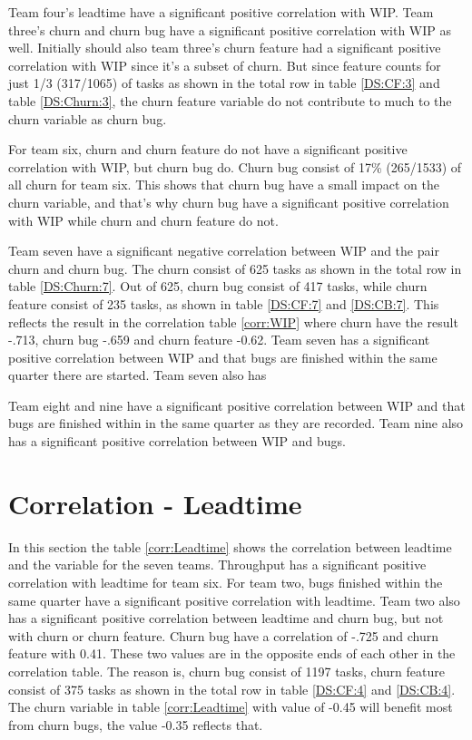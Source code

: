 \documentclass[UKenglish]{ifimaster}  %
\begin{document}
Team four's leadtime have a significant positive correlation with WIP.  Team three's churn and churn bug have a significant positive correlation with WIP as well.  Initially should also team three's churn feature had a significant positive correlation with WIP since it's a subset of churn.  But since feature counts for just 1/3 (317/1065) of tasks as shown in the total row in table \ref{DS:CF:3} and table \ref{DS:Churn:3}, the churn feature variable do not contribute to much to the churn variable as churn bug.

For team six, churn and churn feature do not have a significant positive correlation with WIP, but churn bug do. Churn bug consist of 17\% (265/1533) of all churn for team six. This shows that churn bug have a small impact on the churn variable, and that's why churn bug have a significant positive correlation with WIP while churn and churn feature do not.

Team seven have a significant negative correlation between WIP and the pair churn and churn bug. The churn consist of 625 tasks as shown in the total row in table \ref{DS:Churn:7}. Out of 625, churn bug consist of 417 tasks, while churn feature consist of 235 tasks, as shown in table \ref{DS:CF:7} and \ref{DS:CB:7}. This reflects the result in the correlation table \ref{corr:WIP} where churn have the result -.713, churn bug -.659 and churn feature -0.62.  Team seven has a significant positive correlation between WIP and that bugs are finished within the same quarter there are started. Team seven also has 

Team eight and nine have a significant positive correlation between WIP and that bugs are finished within in the same quarter as they are recorded. Team nine also has a significant positive correlation between WIP and bugs. 


\section{Correlation - Leadtime}
\label{sec:corr:lt}
In this section the table \ref{corr:Leadtime} shows the correlation between leadtime and the variable for the seven teams.  Throughput has a significant positive correlation with leadtime for team six.  For team two, bugs finished within the same quarter have a significant positive correlation with leadtime.  Team two also has a significant positive correlation between leadtime and churn bug, but not with churn or churn feature. Churn bug have a correlation of -.725 and churn feature with 0.41. These two values are in the opposite ends of each other in the correlation table. The reason is, churn bug consist of 1197 tasks, churn feature consist of 375 tasks as shown in the total row in table \ref{DS:CF:4} and \ref{DS:CB:4}.  The churn variable in table \ref{corr:Leadtime} with value of -0.45 will benefit most from churn bugs, the value -0.35 reflects that.
\end{document}
